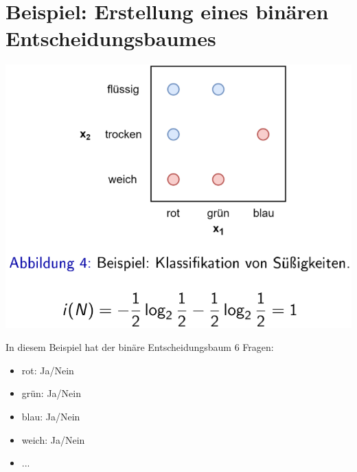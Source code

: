 \documentclass{report}
\begin{document}
\section{Beispiel: Erstellung eines binären Entscheidungsbaumes}

\begin{center}
  \includegraphics[scale=.3]{ml07_7}
\end{center}

In diesem Beispiel hat der binäre Entscheidungsbaum 6 Fragen:\\
\vspace*{-1.5em}
\begin{itemize}
  \item rot: Ja/Nein
  \item grün: Ja/Nein
  \item blau: Ja/Nein
  \item weich: Ja/Nein
  \item ...
\end{itemize}
\end{document}
